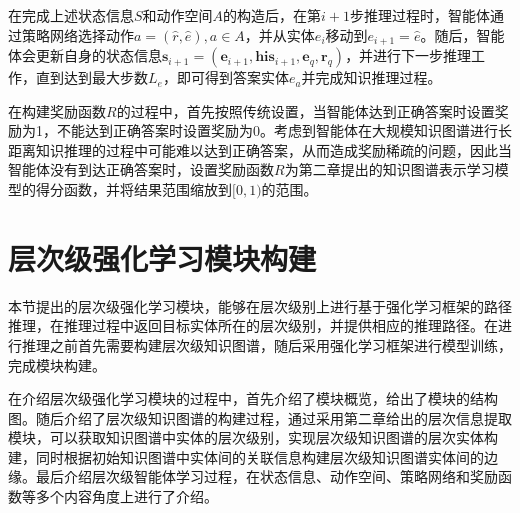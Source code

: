 \documentclass[algorithmlist, AutoFakeBold, AutoFakeSlant, figurelist, tablelist, nomlist, masters]{seuthesix}
\begin{document}
在完成上述状态信息$S$和动作空间$A$的构造后，在第$i+1$步推理过程时，智能体通过策略网络选择动作$a = (\hat{r}, \hat{e}), a \in A$，并从实体$e_i$移动到$e_{i+1} = \hat{e}$。随后，智能体会更新自身的状态信息$\bm{s}_{i+1} = (\bm{e}_{i+1}, \bm{his}_{i+1}, \bm{e}_q, \bm{r}_q)$，并进行下一步推理工作，直到达到最大步数$L_e$，即可得到答案实体$e_a$并完成知识推理过程。

在构建奖励函数$R$的过程中，首先按照传统设置，当智能体达到正确答案时设置奖励为1，不能达到正确答案时设置奖励为0。考虑到智能体在大规模知识图谱进行长距离知识推理的过程中可能难以达到正确答案，从而造成奖励稀疏的问题，因此当智能体没有到达正确答案时，设置奖励函数$R$为第二章提出的知识图谱表示学习模型的得分函数，并将结果范围缩放到$[0, 1)$的范围。


\section{层次级强化学习模块构建}
本节提出的层次级强化学习模块，能够在层次级别上进行基于强化学习框架的路径推理，在推理过程中返回目标实体所在的层次级别，并提供相应的推理路径。在进行推理之前首先需要构建层次级知识图谱，随后采用强化学习框架进行模型训练，完成模块构建。

在介绍层次级强化学习模块的过程中，首先介绍了模块概览，给出了模块的结构图。随后介绍了层次级知识图谱的构建过程，通过采用第二章给出的层次信息提取模块，可以获取知识图谱中实体的层次级别，实现层次级知识图谱的层次实体构建，同时根据初始知识图谱中实体间的关联信息构建层次级知识图谱实体间的边缘。最后介绍层次级智能体学习过程，在状态信息、动作空间、策略网络和奖励函数等多个内容角度上进行了介绍。
\end{document}
